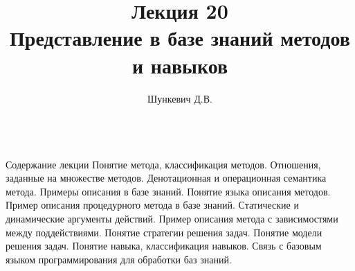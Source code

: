 \title{Лекция 20\\Представление в базе знаний методов и навыков}
\author[]{Шункевич Д.В.}

\begin{frame}
	\titlepage
\end{frame}

\begin{frame}{\\Содержание лекции}
	\topline
	\justifying
	Понятие метода, классификация методов. Отношения, заданные на множестве методов. Денотационная и операционная семантика метода. Примеры описания в базе знаний. Понятие языка описания методов. Пример описания процедурного метода в базе знаний. Статические и динамические аргументы действий. Пример описания метода с зависимостями между поддействиями. Понятие стратегии решения задач. Понятие модели решения задач. Понятие навыка, классификация навыков. Связь с базовым языком программирования для обработки баз знаний.
\end{frame}